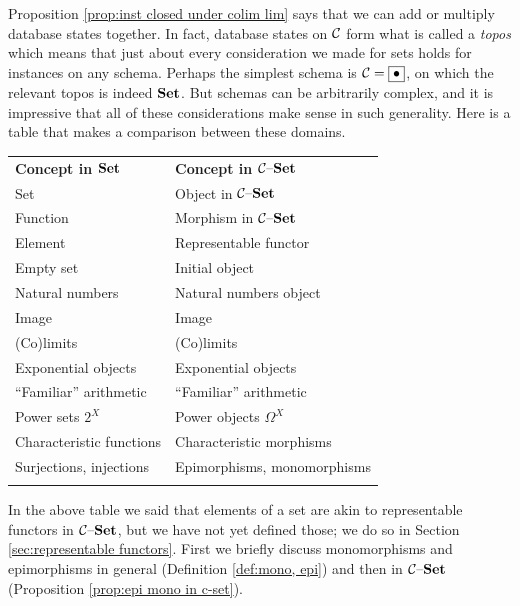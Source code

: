 \documentclass[CT4S-EN-RU]{subfiles}
\begin{document}
Proposition \ref{prop:inst closed under colim lim} says that we can add or multiply database states together. In fact, database states on $\mathcal{C}$ form what is called a {\em topos} which means that just about every consideration we made for sets holds for instances on any schema. Perhaps the simplest schema is $\mathcal{C}=\fbox{$\bullet$}$, on which the relevant topos is indeed $\Set$. But schemas can be arbitrarily complex, and it is impressive that all of these considerations make sense in such generality. Here is a table that makes a comparison between these domains.
\begin{center}
\begin{tabular}{| l | l |}\bhline
\multicolumn{2}{| c |}{Dictionary between $\Set$ and $\mcC\set$}\\\hline
{\bf Concept in $\Set$}&{\bf Concept in $\mcC\set$}\\\bbhline
Set & Object in $\mcC\set$\\\hline
Function & Morphism in $\mcC\set$\\\hline
Element&Representable functor\\\hline
Empty set & Initial object\\\hline
Natural numbers&Natural numbers object\\\hline
Image&Image\\\hline
(Co)limits&(Co)limits\\\hline
Exponential objects&Exponential objects\\\hline
“Familiar” arithmetic&“Familiar” arithmetic\\\hline
Power sets $2^X$&Power objects $\Omega^X$\\\hline
Characteristic functions&Characteristic morphisms\\\hline
Surjections, injections&Epimorphisms, monomorphisms\\\bhline
\end{tabular}
\end{center}

In the above table we said that elements of a set are akin to representable functors in $\mcC\set$, but we have not yet defined those; we do so in Section \ref{sec:representable functors}. First we briefly discuss monomorphisms and epimorphisms in general (Definition \ref{def:mono, epi}) and then in $\mcC\set$ (Proposition \ref{prop:epi mono in c-set}). 
\end{document}
